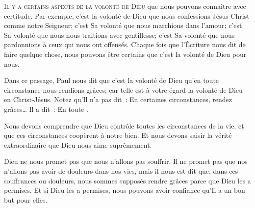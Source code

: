 \dvrule






\lettrine{I}{l y a certains aspects de la volonté de Dieu}
 que nous pouvons connaître avec certitude. Par exemple, c'est la volonté
 de Dieu que nous confessions Jésus-Christ comme notre Seigneur;
 c'est Sa volonté que nous marchions dans l'amour;
 c'est Sa volonté que nous nous traitions avec gentillesse;
 c'est Sa volonté que nous pardonnions à ceux qui nous ont offensés.
 Chaque fois que l'Écriture nous dit de faire quelque chose,
 nous pouvons être certains que c'est la volonté de Dieu pour nous.

Dans ce passage, Paul nous dit que c'est la volonté de Dieu \og qu'en toute
 circonstance nous rendions grâces; car telle est à votre égard la volonté
 de Dieu en Christ-Jésus. \fg{}
 Notez qu'Il n'a pas dit~: 
 \og En certaines circonstances, rendez grâces\dots{} \fg{}
 Il a dit~:  \og En toute \fg{}.


Nous devons comprendre que Dieu contrôle toutes les circonstances de la vie,
 et que ces circonstances coopèrent à notre bien.
 Et nous devons saisir la vérité extraordinaire que Dieu nous aime suprêmement.

Dieu ne nous promet pas que nous n'allons pas souffrir.
 Il ne promet pas que nos n'allons pas avoir de douleurs dans nos vies,
 mais il nous est dit que, dans ces souffrances ou douleurs,
 nous sommes supposés rendre grâces \ocadr parce que Dieu les a permises.
 Et si Dieu les a permises, nous pouvons avoir confiance qu'Il a un bon but
 pour elles.

\dvrule



